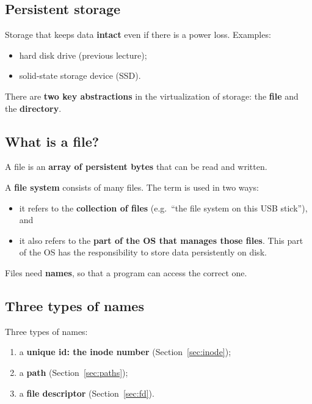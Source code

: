 \documentclass[11pt,a4paper]{article}
\begin{document}
\subsection{Persistent storage}

\begin{defbox}
Storage that keeps data \textbf{intact} even if there is a power loss.
Examples:
\begin{itemize}
  \item hard disk drive (previous lecture);
  \item solid-state storage device (SSD).
\end{itemize}
\end{defbox}

There are \textbf{two key abstractions} in the virtualization of storage:
the \textbf{file} and the \textbf{directory}.

\subsection{What is a file?}

\begin{defbox}[File]
A file is an \textbf{array of persistent bytes} that can be read and written.
\end{defbox}

A \textbf{file system} consists of many files. The term is used in two ways:
\begin{itemize}
  \item it refers to the \textbf{collection of files} (e.g.\ ``the file
        system on this USB stick''), and
  \item it also refers to the \textbf{part of the OS that manages those
        files}. This part of the OS has the responsibility to store data
        persistently on disk.
\end{itemize}
Files need \textbf{names}, so that a program can access the correct one.

\subsection{Three types of names}

Three types of names:
\begin{enumerate}
  \item a \textbf{unique id: the inode number} (Section~\ref{sec:inode});
  \item a \textbf{path} (Section~\ref{sec:paths});
  \item a \textbf{file descriptor} (Section~\ref{sec:fd}).
\end{enumerate}
\end{document}
